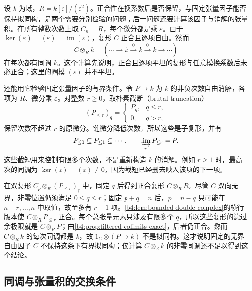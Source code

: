 \begin{example}\label{b4:exm:unbounded-flat-tensor}
	设 \(k\) 为域，\(R=k[\varepsilon]/(\varepsilon^2)\)。正合性在换系数后是否保留，与固定张量因子能否保持拟同构，是两个需要分别检验的问题；后一问题还要计算该因子与消解的张量积。在所有整数次数上取 \(C_n=R\)，每个微分都是乘 \(\varepsilon\)。由于 \(\ker(\varepsilon)=(\varepsilon)=\operatorname{im}(\varepsilon)\)，复形 \(C\) 正合且逐项自由。然而
	\[
		C\otimes_R k=(\cdots\longrightarrow k\xrightarrow{0}k\xrightarrow{0}k\longrightarrow\cdots)
	\]
	在每次都有同调 \(k\)。这个计算先说明，正合且逐项平坦的复形与任意模换系数后未必正合；这里的圈模 \((\varepsilon)\) 并不平坦。

	\ProseParagraphBreak
	还能用它检验固定张量因子的有界条件。令 \(P\to k\) 为 \(k\) 的非负次数自由消解，各项为 \(R\)、微分乘 \(\varepsilon\)。对整数 \(r\ge0\)，取朴素截断（brutal truncation）
	\[
		(P_{\le r})_q=
		\begin{cases}
			P_q,&q\le r,\\
			0,&q>r,
		\end{cases}
	\]
	保留次数不超过 \(r\) 的原微分。链微分降低次数，所以这些是子复形，并有
	\[
		P_{\le0}\subseteq P_{\le1}\subseteq\cdots, \qquad \varinjlim_rP_{\le r}=P.
	\]
	这些截短用来控制有限多个次数，不是重新构造 \(k\) 的消解。例如 \(r\ge1\) 时，最高次的同调为 \(\ker(\varepsilon)=(\varepsilon)\ne0\)，因为截短已经删去映入该项的下一项。

	\ProseParagraphBreak
	在双复形 \(C_p\otimes_R(P_{\le r})_q\) 中，固定 \(q\) 后得到正合复形 \(C\otimes_R R\)。尽管 \(C\) 双向无界，非零位置仍须满足 \(0\le q\le r\)；固定 \(p+q=n\) 后，\(p=n-q\) 只可能在 \(n-r,\ldots,n\) 中取值，故至多有 \(r+1\) 项。\cref{b4:lem:bounded-double-complex}的横行版本使 \(C\otimes_RP_{\le r}\) 正合。每个总张量元素只涉及有限多个 \(q\)，所以这些复形的滤过余极限就是 \(C\otimes_RP\)；由\cref{b4:prop:filtered-colimits-exact}，后者仍正合。然而 \(C\otimes_R k\) 的每次同调都是 \(k\)，故 \(1_C\otimes(P\to k)\) 不是拟同构。这才说明固定的无界自由因子 \(C\) 不保持这条下有界拟同构；仅计算 \(C\otimes_Rk\) 的非零同调还不足以得到这个结论。
\end{example}

\subsection{同调与张量积的交换条件}
\label{b4:subsec:0902:03}

